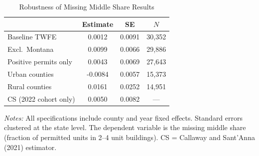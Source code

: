 \begin{table}[htbp]
\centering
\caption{Robustness of Missing Middle Share Results}
\label{tab:robust}
\begin{threeparttable}
\begin{tabular}{lccc}
\hline\hline
 & Estimate & SE & $N$ \\
\hline
Baseline TWFE & 0.0012 & 0.0091 & 30,352 \\
Excl.\ Montana & 0.0099 & 0.0066 & 29,886 \\
Positive permits only & 0.0043 & 0.0069 & 27,643 \\
Urban counties & -0.0084 & 0.0057 & 15,373 \\
Rural counties & 0.0161 & 0.0252 & 14,951 \\
CS (2022 cohort only) & 0.0050 & 0.0082 & --- \\
\hline\hline
\end{tabular}
\begin{tablenotes}[flushleft]\small
\item \textit{Notes:} All specifications include county and year fixed effects. Standard errors clustered at the state level. The dependent variable is the missing middle share (fraction of permitted units in 2--4 unit buildings). CS = Callaway and Sant'Anna (2021) estimator.
\end{tablenotes}
\end{threeparttable}
\end{table}

